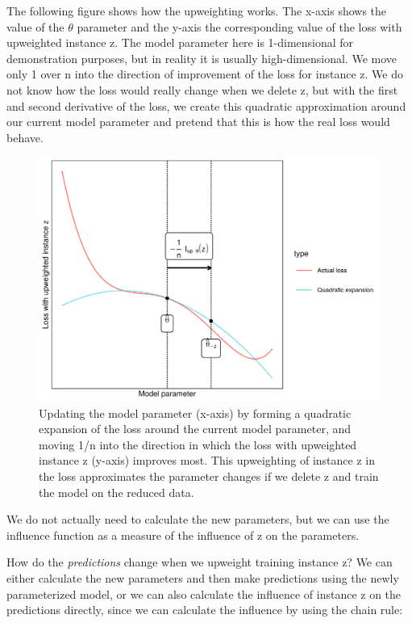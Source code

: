 \documentclass[12pt,]{krantz}
\begin{document}
The following figure shows how the upweighting works. The x-axis shows
the value of the \(\theta\) parameter and the y-axis the corresponding
value of the loss with upweighted instance z. The model parameter here
is 1-dimensional for demonstration purposes, but in reality it is
usually high-dimensional. We move only 1 over n into the direction of
improvement of the loss for instance z. We do not know how the loss
would really change when we delete z, but with the first and second
derivative of the loss, we create this quadratic approximation around
our current model parameter and pretend that this is how the real loss
would behave.

\begin{figure}

{\centering \includegraphics[width=\textwidth]{images/quadratic-expansion-1} 

}

\caption{Updating the model parameter (x-axis) by forming a quadratic expansion of the loss around the current model parameter, and moving 1/n into the direction in which the loss with upweighted instance z (y-axis) improves most. This upweighting of instance z in the loss approximates the parameter changes if we delete z and train the model on the reduced data.}\label{fig:quadratic-expansion}
\end{figure}

We do not actually need to calculate the new parameters, but we can use
the influence function as a measure of the influence of z on the
parameters.

How do the \emph{predictions} change when we upweight training instance
z? We can either calculate the new parameters and then make predictions
using the newly parameterized model, or we can also calculate the
influence of instance z on the predictions directly, since we can
calculate the influence by using the chain rule:
\end{document}
